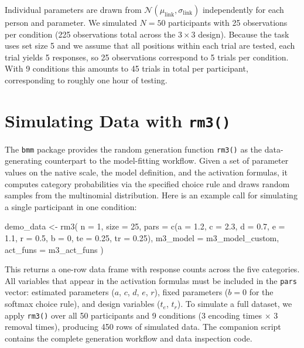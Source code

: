\documentclass[
  man,
  floatsintext,
  longtable,
  nolmodern,
  notxfonts,
  notimes,
  colorlinks=true,linkcolor=blue,citecolor=blue,urlcolor=blue]{apa7}
\newenvironment{Shaded}{\begin{snugshade}}{\end{snugshade}}
\newcommand{\AttributeTok}[1]{\textcolor[rgb]{0.40,0.45,0.13}{#1}}
\newcommand{\DecValTok}[1]{\textcolor[rgb]{0.68,0.00,0.00}{#1}}
\newcommand{\FloatTok}[1]{\textcolor[rgb]{0.68,0.00,0.00}{#1}}
\newcommand{\FunctionTok}[1]{\textcolor[rgb]{0.28,0.35,0.67}{#1}}
\newcommand{\NormalTok}[1]{\textcolor[rgb]{0.00,0.23,0.31}{#1}}
\newcommand{\OtherTok}[1]{\textcolor[rgb]{0.00,0.23,0.31}{#1}}
\begin{document}
Individual parameters are drawn from
\(\mathcal{N}(\mu_{\text{link}}, \sigma_{\text{link}})\) independently
for each person and parameter. We simulated \(N = 50\) participants with
25 observations per condition (225 observations total across the
\(3 \times 3\) design). Because the task uses set size 5 and we assume
that all positions within each trial are tested, each trial yields 5
responses, so 25 observations correspond to 5 trials per condition. With
9 conditions this amounts to 45 trials in total per participant,
corresponding to roughly one hour of testing.

\section{\texorpdfstring{Simulating Data with
\texttt{rm3()}}{Simulating Data with rm3()}}\label{simulating-data-with-rm3}

The \texttt{bmm} package provides the random generation function
\texttt{rm3()} as the data-generating counterpart to the model-fitting
workflow. Given a set of parameter values on the native scale, the model
definition, and the activation formulas, it computes category
probabilities via the specified choice rule and draws random samples
from the multinomial distribution. Here is an example call for
simulating a single participant in one condition:

\begin{Shaded}
\begin{Highlighting}[]
\NormalTok{demo\_data }\OtherTok{\textless{}{-}} \FunctionTok{rm3}\NormalTok{(}
  \AttributeTok{n =} \DecValTok{1}\NormalTok{, }\AttributeTok{size =} \DecValTok{25}\NormalTok{,}
  \AttributeTok{pars =} \FunctionTok{c}\NormalTok{(}\AttributeTok{a =} \FloatTok{1.2}\NormalTok{, }\AttributeTok{c =} \FloatTok{2.3}\NormalTok{, }\AttributeTok{d =} \FloatTok{0.7}\NormalTok{, }\AttributeTok{e =} \FloatTok{1.1}\NormalTok{, }\AttributeTok{r =} \FloatTok{0.5}\NormalTok{,}
           \AttributeTok{b =} \DecValTok{0}\NormalTok{, }\AttributeTok{te =} \FloatTok{0.25}\NormalTok{, }\AttributeTok{tr =} \FloatTok{0.25}\NormalTok{),}
  \AttributeTok{m3\_model =}\NormalTok{ m3\_model\_custom,}
  \AttributeTok{act\_funs =}\NormalTok{ m3\_act\_funs}
\NormalTok{)}
\end{Highlighting}
\end{Shaded}

This returns a one-row data frame with response counts across the five
categories. All variables that appear in the activation formulas must be
included in the \texttt{pars} vector: estimated parameters (\(a\),
\(c\), \(d\), \(e\), \(r\)), fixed parameters (\(b = 0\) for the softmax
choice rule), and design variables (\(t_e\), \(t_r\)). To simulate a
full dataset, we apply \texttt{rm3()} over all 50 participants and 9
conditions (\(3\) encoding times \(\times\) \(3\) removal times),
producing 450 rows of simulated data. The companion script contains the
complete generation workflow and data inspection code.
\end{document}
